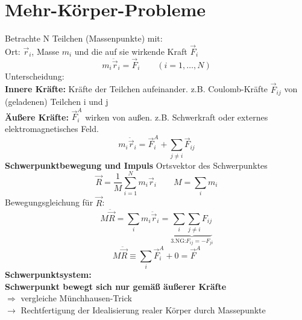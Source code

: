 \documentclass[titlepage,12pt,a4paper,ngerman]{report}
\begin{document}
\section{Mehr-Körper-Probleme}
Betrachte N Teilchen (Massenpunkte) mit:\\
Ort: $\vec{r}_i$, Masse $m_i$ und die auf sie wirkende Kraft $\vec{F}_i$ 
$$m_i \ddot{\vec{r}}_i = \vec{F}_i \qquad (i = 1, \dots , N)$$
Unterscheidung:\\
\textbf{Innere Kräfte:} Kräfte der Teilchen aufeinander. z.B. Coulomb-Kräfte $\vec{F}_{ij}$ von (geladenen) Teilchen i und j\\
\textbf{Äußere Kräfte:} $\vec{F}^A_i$ wirken von außen. z.B. Schwerkraft oder externes elektromagnetisches Feld.\\
$$m_i \ddot{\vec{r}}_i = \vec{F}_i^A + \sum _{j\neq i} \vec{F}_{ij}$$
\textbf{Schwerpunktbewegung und Impuls}
Ortsvektor des Schwerpunktes
$$\vec{R} = \frac{1}{M} \sum_{i=1}^{N} m_i \vec{r}_i \qquad M = \sum_{i} m_i$$
Bewegungsgleichung für $\vec{R}$:
$$M\ddot{\vec{R}} = \sum_{i} m_i \ddot{\vec{r}}_i = \underbrace{\sum_{i} \sum_{j\neq i} F_{ij}}_{\textrm{3.NG:} F_{ij} = - F_{ji}}$$
$$M \ddot{\vec{R}} \equiv \sum_{i} \vec{F}_i^A + 0 =\vec{F}^A$$
\textbf{Schwerpunktsystem:}\\ 
\indent \textbf{Schwerpunkt bewegt sich nur gemäß äußerer Kräfte}\\ 
$\Rightarrow$ vergleiche Münchhausen-Trick\\
$\rightarrow$ Rechtfertigung der Idealisierung realer Körper durch Massepunkte

\end{document}
